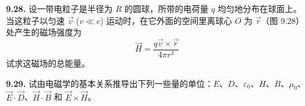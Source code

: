 \vfill
\newpage

\textbf{9.28.} 设一带电粒子是半径为 $R$ 的圆球，所带的电荷量 $q$ 均匀地分布在球面上。当这粒子以匀速 $\vec{v}$ ($v \ll c$) 运动时，在它外面的空间里离球心 $O$ 为 $\vec{r}$（图 9.28）处产生的磁场强度为
\[
\vec{H} = \frac{q \vec{v} \times \vec{r}}{4 \pi r^{3}}
\]
试求这磁场的总能量。

\begin{center}
\end{center}

\vfill
\newpage

\textbf{9.29.} 试由电磁学的基本关系推导出下列一些量的单位：$E$、$D$、$\varepsilon_0$、$H$、$B$、$\mu_0$、$\vec{E} \cdot \vec{D}$、$\vec{H} \cdot \vec{B}$ 和 $\vec{E} \times \vec{H}$。

\vfill
\newpage
